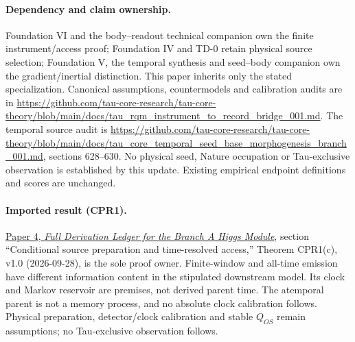 \documentclass[11pt]{article}
\begin{document}
\paragraph{Dependency and claim ownership.}
Foundation VI and the body--readout technical companion own the finite instrument/access proof; Foundation IV and TD-0 retain physical source selection; Foundation V, the temporal synthesis and seed--body companion own the gradient/inertial distinction. This paper inherits only the stated specialization. Canonical assumptions, countermodels and calibration audits are in \url{https://github.com/tau-core-research/tau-core-theory/blob/main/docs/tau_rqm_instrument_to_record_bridge_001.md}. The temporal source audit is \url{https://github.com/tau-core-research/tau-core-theory/blob/main/docs/tau_core_temporal_seed_base_morphogenesis_branch_001.md}, sections 628--630. No physical seed, Nature occupation or Tau-exclusive observation is established by this update. Existing empirical endpoint definitions and scores are unchanged.

\paragraph{Imported result (CPR1).}
\href{https://github.com/tau-core-research/tau-core-higgs-module-paper4/blob/main/paper4_full_derivation/full_derivation.pdf#nameddest=cpr1}{Paper 4, \emph{Full Derivation Ledger for the Branch A Higgs Module}}, section ``Conditional source preparation and time-resolved access,'' Theorem CPR1(c), v1.0 (2026-09-28), is the sole proof owner.
Finite-window and all-time emission have different information content in the stipulated downstream model. Its clock and Markov reservoir are premises, not derived parent time. The atemporal parent is not a memory process, and no absolute clock calibration follows.
Physical preparation, detector/clock calibration and stable $Q_{OS}$ remain assumptions; no Tau-exclusive observation follows.
\end{document}
